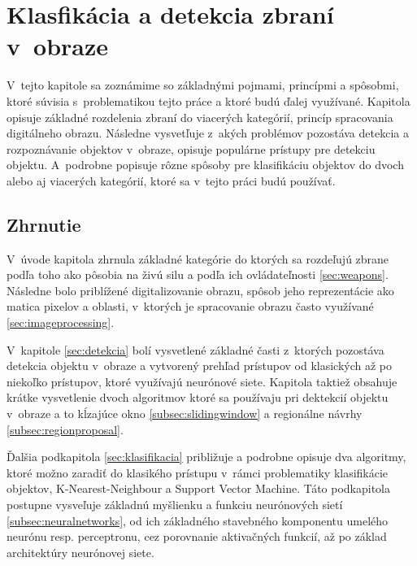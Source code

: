 
\chapter{Klasfikácia a detekcia zbraní v~obraze}
\label{chap:technologie}

V~tejto kapitole sa zoznámime so základnými pojmami, princípmi a spôsobmi, ktoré súvisia s~problematikou tejto práce a ktoré budú ďalej využívané.
Kapitola opisuje základné rozdelenia zbraní do viacerých kategórií, princíp spracovania digitálneho obrazu.
Následne vysvetľuje z~akých problémov pozostáva detekcia a rozpoznávanie objektov v~obraze, opisuje populárne prístupy pre detekciu objektu.
A~podrobne popisuje rôzne spôsoby pre klasifikáciu objektov do dvoch alebo aj viacerých kategórií, ktoré sa v~tejto práci budú používať.













\section{Zhrnutie}

V~úvode kapitola zhrnula základné kategórie do ktorých sa rozdeľujú zbrane podľa toho ako pôsobia na živú silu a podľa ich ovládateľnosti \ref{sec:weapons}.
Následne bolo priblížené digitalizovanie obrazu, spôsob jeho reprezentácie ako matica pixelov a oblasti, v~ktorých je spracovanie obrazu často využívané \ref{sec:imageprocessing}.

V~kapitole \ref{sec:detekcia} bolí vysvetlené základné časti z~ktorých pozostáva detekcia objektu v~obraze a vytvorený prehľad prístupov od
    klasických až po niekoľko prístupov, ktoré využívajú neurónové siete.
Kapitola taktiež obsahuje krátke vysvetlenie dvoch algoritmov ktoré sa používaju pri dektekcií objektu v~obraze a to kĺzajúce okno \ref{subsec:slidingwindow} a
    regionálne návrhy \ref{subsec:regionproposal}.

Ďalšia podkapitola \ref{sec:klasifikacia} približuje a podrobne opisuje dva algoritmy, ktoré možno zaradiť do klasikého prístupu v~rámci problematiky klasifikácie objektov,
    K-Nearest-Neighbour a Support Vector Machine.
Táto podkapitola postupne vysveľuje základnú myšlienku a funkciu neurónových sietí \ref{subsec:neuralnetworks}, od ich základného stavebného komponentu umelého neurónu resp. perceptronu,
    cez porovnanie aktivačných funkcií, až po základ architektúry neurónovej siete.

